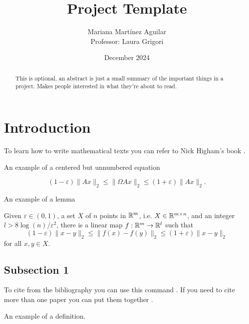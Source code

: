 \documentclass{article}
\title{Project Template}
\author{Mariana Martínez Aguilar \\ \small{Professor: Laura Grigori}}
\date{December 2024}
\begin{document}
\pagestyle{fancy}
\maketitle


\begin{abstract} %
This is optional, an abstract is just a small summary of the important things in a project. Makes people interested in what they're about to read.
\end{abstract} %

\section{Introduction}

To learn how to write mathematical texts you can refer to Nick Higham's book \href{https://epubs.siam.org/doi/book/10.1137/1.9780898719550}{}.

An example of a centered but unnumbered equation

\[ (1 - \varepsilon)\| A x \|_2 \leq \| \Omega A x \|_2 \leq (1 + \varepsilon)\|Ax\|_2.  \]

An example of a lemma

\begin{lemma}
    Given $\varepsilon \in (0, 1)$, a set $X$ of $n$ points in ${\mathbb{R}}^{m}$, i.e. $X \in {\ensuremath{\mathbb{R}}}^{m \times n}$, and an integer $l > 8\log(n)/\varepsilon^{2}$, there is a linear map $f: {\mathbb{R}}^{m} \to {\ensuremath{\mathbb{R}}}^{l}$ such that
    \[ (1 - \varepsilon)\| x - y \|_2 \leq \| f(x) - f(y) \|_2 \leq (1 + \varepsilon) \| x - y \|_2 \]
    for all $x, y \in X$.
\end{lemma}


\subsection{Subsection 1}

To cite from the bibliography you can use this command \cite{tropp_improved_2011}. If you need to cite more than one paper you can put them together \cite{cartis_hashing_2021, chenakkod_optimal_2024, nelson_osnap_2012, nelson_lower_2013}.

An example of a definition. 
\end{document}
